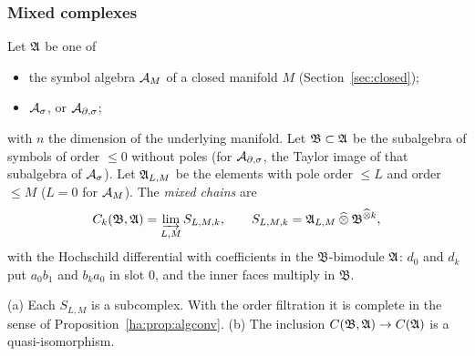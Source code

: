 \subsubsection*{Mixed complexes}
Let \(\mathfrak A\) be one of
\begin{itemize}
\item the symbol algebra \(\mathcal A_M\) of a closed manifold \(M\)
(Section~\ref{sec:closed});
\item \(\mathcal A_\sigma\), or \(\mathcal A_{\partial,\sigma}\);
\end{itemize}
with \(n\) the dimension of the underlying manifold. Let \(\mathfrak
B\subset\mathfrak A\) be the subalgebra of symbols of order \(\le0\) without
poles (for \(\mathcal A_{\partial,\sigma}\), the Taylor image of that subalgebra of \(\mathcal A_\sigma\)). Let
\(\mathfrak A_{L,M}\) be the elements with pole order \(\le L\) and order \(\le
M\) (\(L=0\) for \(\mathcal A_M\)). The \emph{mixed chains} are
\[
 C_k(\mathfrak B,\mathfrak A)=\varinjlim_{L,M}S_{L,M,k},\qquad
 S_{L,M,k}=\mathfrak A_{L,M}\mathbin{\widehat\otimes}\mathfrak B^{\mathbin{\widehat\otimes} k},
\]
with the Hochschild differential with coefficients in the
\(\mathfrak B\)-bimodule \(\mathfrak A\): \(d_0\) and \(d_k\) put \(a_0b_1\) and
\(b_ka_0\) in slot \(0\), and the inner faces multiply in \(\mathfrak B\).

\begin{lemma}\label{ha:lem:mixed}
\textup{(a)} Each \(S_{L,M}\) is a subcomplex. With the order filtration
it is complete in the sense of Proposition~\ref{ha:prop:algconv}.
\textup{(b)} The inclusion \(C(\mathfrak B,\mathfrak A)\to C(\mathfrak A)\) is a
quasi-isomorphism.
\end{lemma}

